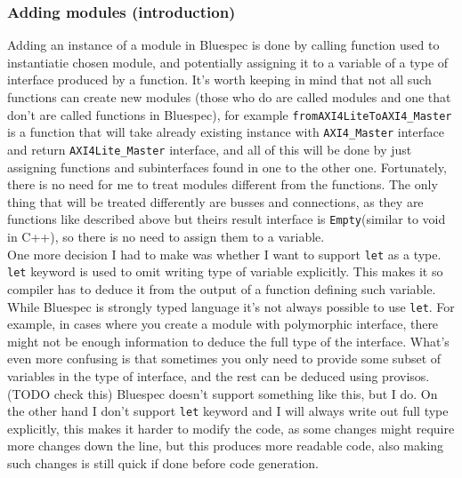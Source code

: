 \documentclass[14pt]{report}
\begin{document}
\subsubsection{Adding modules (introduction)}
Adding an instance of a module in Bluespec is done by calling function used to instantiatie chosen module, and potentially assigning it to a variable of a type of interface produced by a function. It's worth keeping in mind that not all such functions can create new modules (those who do are called modules and one that don't are called functions in Bluespec), for example \verb!fromAXI4LiteToAXI4_Master! is a function that will take already existing instance with \verb!AXI4_Master! interface and return \verb!AXI4Lite_Master! interface, and all of this will be done by just assigning functions and subinterfaces found in one to the other one. Fortunately, there is no need for me to treat modules different from the functions. The only thing that will be treated differently are busses and connections, as they are functions like described above but theirs result interface is \verb!Empty!(similar to void in C++), so there is no need to assign them to a variable.
\\
One more decision I had to make was whether I want to support \verb!let! as a type. \verb!let! keyword is used to omit writing type of variable explicitly. This makes it so compiler has to deduce it from the output of a function defining such variable. While Bluespec is strongly typed language it's not always possible to use \verb!let!. For example, in cases where you create a module with polymorphic interface, there might not be enough information to deduce the full type of the interface. What's even more confusing is that sometimes you only need to provide some subset of variables in the type of interface, and the rest can be deduced using provisos. (TODO check this) Bluespec doesn't support something like this, but I do. On the other hand I don't support \verb!let! keyword and I will always write out full type explicitly, this makes it harder to modify the code, as some changes might require more changes down the line, but this produces more readable code, also making such changes is still quick if done before code generation.
\end{document}
